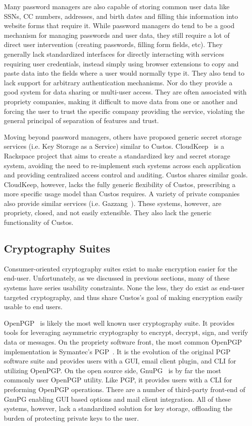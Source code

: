 Many password managers are also capable of storing common user data
like SSNs, CC numbers, addresses, and birth dates and filling this
information into website forms that require it. While password
managers do tend to be a good mechanism for managing passwords and
user data, they still require a lot of direct user intervention
(creating passwords, filling form fields, etc). They generally lack
standardized interfaces for directly interacting with services
requiring user credentials, instead simply using browser extensions to
copy and paste data into the fields where a user would normally type
it. They also tend to lack support for arbitrary authentication
mechanisms. Nor do they provide a good system for data sharing or
multi-user access. They are often associated with propriety companies,
making it difficult to move data from one or another and forcing the
user to trust the specific company providing the service, violating
the general principal of separation of features and trust.

Moving beyond password managers, others have proposed generic secret
storage services (i.e. Key Storage as a Service) similar to Custos.
CloudKeep~\cite{cloudkeep-presentation, cloudkeep} is a Rackspace
project that aims to create a standardized key and secret storage
system, avoiding the need to re-implement such systems across each
application and providing centralized access control and
auditing. Custos shares similar goals. CloudKeep, however, lacks the
fully generic flexibility of Custos, prescribing a more specific usage
model than Custos requires. A variety of private companies also
provide similar services (i.e. Gazzang~\cite{gazzang}). These systems,
however, are propriety, closed, and not easily extensible. They also
lack the generic functionality of Custos.

\subsection{Cryptography Suites}

Consumer-oriented cryptography suites exist to make encryption easier
for the end-user. Unfortunately, as we discussed in previous sections,
many of these systems have series usability constraints. None the
less, they do exist as end-user targeted cryptography, and thus share
Custos's goal of making encryption easily usable to end users.

OpenPGP~\cite{openpgp} is likely the most well known user cryptography
suite. It provides tools for leveraging asymmetric cryptography to
encrypt, decrypt, sign, and verify data or messages. On the propriety
software front, the most common OpenPGP implementation is Symantec's
PGP~\cite{pgp}. It is the evolution of the original PGP software suite
and provides users with a GUI, email client plugin, and CLI for
utilizing OpenPGP. On the open source side, GnuPG~\cite{gnupg} is by
far the most commonly user OpenPGP utility. Like PGP, it provides
users with a CLI for preforming OpenPGP operations. There are a number
of third-party front-end of GnuPG enabling GUI based options and mail
client integration. All of these systems, however, lack a standardized
solution for key storage, offloading the burden of protecting private
keys to the user.

